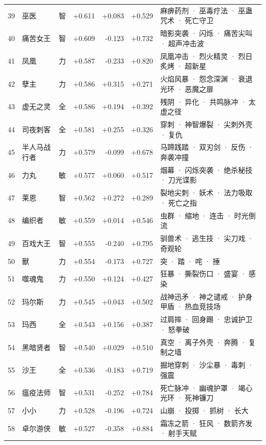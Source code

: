 \documentclass[10pt,a4paper]{article}
\begin{document}
{\begin{longtable}{@{}rlcrrrp{7.6cm}@{}}
39 & 巫医 & 智 & +0.611 & +0.083 & +0.529 & \small 麻痹药剂 · 巫毒疗法 · 巫蛊咒术 · 死亡守卫 \\
40 & 痛苦女王 & 智 & +0.609 & -0.123 & +0.732 & \small 暗影突袭 · 闪烁 · 痛苦尖叫 · 超声冲击波 \\
41 & 凤凰 & 力 & +0.587 & -0.233 & +0.820 & \small 凤凰冲击 · 烈火精灵 · 烈日炙烤 · 超新星 \\
42 & 孽主 & 力 & +0.586 & +0.315 & +0.271 & \small 火焰风暴 · 怨念深渊 · 衰退光环 · 恶魔之扉 \\
43 & 虚无之灵 & 全 & +0.586 & +0.194 & +0.392 & \small 残阴 · 异化 · 共鸣脉冲 · 太虚之径 \\
44 & 司夜刺客 & 全 & +0.581 & +0.255 & +0.326 & \small 穿刺 · 神智爆裂 · 尖刺外壳 · 复仇 \\
45 & 半人马战行者 & 力 & +0.579 & -0.099 & +0.678 & \small 马蹄践踏 · 双刃剑 · 反伤 · 奔袭冲撞 \\
46 & 力丸 & 敏 & +0.577 & +0.060 & +0.517 & \small 烟幕 · 闪烁突袭 · 绝杀秘技 · 刀光谍影 \\
47 & 莱恩 & 智 & +0.562 & +0.272 & +0.289 & \small 裂地尖刺 · 妖术 · 法力吸取 · 死亡之指 \\
48 & 编织者 & 敏 & +0.559 & +0.014 & +0.546 & \small 虫群 · 缩地 · 连击 · 时光倒流 \\
49 & 百戏大王 & 智 & +0.555 & -0.240 & +0.795 & \small 驯兽术 · 逃生技 · 尖刀戏 · 奇观轮 \\
50 & 獸 & 力 & +0.554 & -0.173 & +0.727 & \small 突 · 踏 · 咤 · 捶 \\
51 & 噬魂鬼 & 力 & +0.550 & +0.124 & +0.427 & \small 狂暴 · 撕裂伤口 · 盛宴 · 感染 \\
52 & 玛尔斯 & 力 & +0.545 & +0.043 & +0.502 & \small 战神迅矛 · 神之谴戒 · 护身甲盾 · 热血竞技场 \\
53 & 玛西 & 全 & +0.543 & +0.156 & +0.387 & \small 过肩摔 · 回身踢 · 忠诚护卫 · 怒拳破 \\
54 & 黑暗贤者 & 智 & +0.540 & +0.029 & +0.510 & \small 真空 · 离子外壳 · 奔腾 · 复制之墙 \\
55 & 沙王 & 全 & +0.536 & -0.183 & +0.719 & \small 掘地穿刺 · 沙尘暴 · 毒刺 · 强震 \\
56 & 瘟疫法师 & 智 & +0.531 & -0.252 & +0.784 & \small 死亡脉冲 · 幽魂护罩 · 竭心光环 · 死神镰刀 \\
57 & 小小 & 力 & +0.528 & -0.196 & +0.724 & \small 山崩 · 投掷 · 抓树 · 长大 \\
58 & 卓尔游侠 & 敏 & +0.527 & -0.358 & +0.884 & \small 霜冻之箭 · 狂风 · 数箭齐发 · 射手天赋 \\

\end{longtable}}
\end{document}
